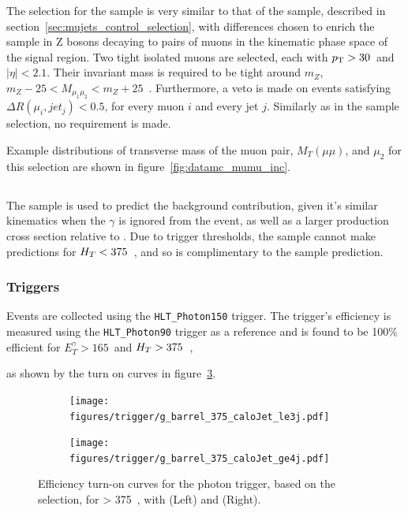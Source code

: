 The selection for the \mmj sample is very similar to that of the \mj sample, 
described in section~\ref{sec:mujets_control_selection}, with differences chosen
to enrich the sample in Z bosons decaying to pairs of muons in the kinematic 
phase space of the signal region. Two tight isolated muons are selected, each 
with ${p_{\text T}} > 30$~\gev and $|\eta| < 2.1$. Their invariant mass is required to be
tight around $m_Z$, $m_Z - 25 < M_{\mu_1\mu_2} < m_Z + 25$~\gev. Furthermore, a 
veto is made on events satisfying $\Delta R(\mu_i, jet_j) < 0.5$, for every muon 
$i$ and every jet $j$. Similarly as in the \mj sample selection, no \alphat
requirement is made.

Example distributions of transverse mass of the muon pair, $M_T(\mu\mu)$, and
$\mu_2$ \Pt for this selection are shown in figure~\ref{fig:datamc_mumu_inc}.

\subsection{\gj}
\label{sec:gjets_control_sample}
The \gj sample is used to predict the \zinv background contribution, given it's 
similar kinematics when the $\gamma$ is ignored from the event, as well as a
larger
production cross section relative to \mmj. Due to trigger thresholds, the \gj
sample cannot make predictions for $H_T<375$~\gev, and so is complimentary to
the \mmj sample prediction.

\subsubsection{Triggers}
Events are collected using the \verb!HLT_Photon150! trigger. The trigger's 
efficiency is measured using the \verb!HLT_Photon90! trigger as a reference and
is found to be 100$\%$ efficient for $E_T^{\gamma}>165$~\gev and $H_T>375$~\gev,

as shown by the turn on curves in figure~\ref{fig:photon_control_trigeff}.

\begin{figure}[t]
  \centering
  \begin{subfigure}[b]{0.35\textwidth}
    \texttt{[image: figures/trigger/g\_barrel\_375\_caloJet\_le3j.pdf]}
    \caption{\njlow}
    \label{fig:photon_control_trigeff_le3j}
  \end{subfigure}
  \begin{subfigure}[b]{0.35\textwidth}
    \texttt{[image: figures/trigger/g\_barrel\_375\_caloJet\_ge4j.pdf]}
    \caption{\njhigh}
    \label{fig:photon_control_trigeff_ge4j}
  \end{subfigure}
  \caption{Efficiency turn-on curves for the photon trigger, based on the \gj 
  selection, for \HT > 375~\gev, with \njlow (Left) and \njhigh(Right).}
  \label{fig:photon_control_trigeff}
\end{figure}

